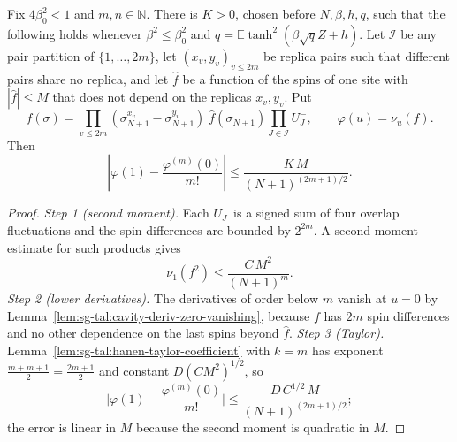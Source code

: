 \begin{lemma}\label{lem:sg-tal:hanen-rect-product-taylor}
\leanok
{}
Fix $4\beta_0^2<1$ and $m,n\in\mathbb N$. There is $K>0$, chosen before $N,\beta,h,q$, such that the following holds whenever
$\beta^2\le\beta_0^2$ and $q=\mathbb E\tanh^2(\beta\sqrt q Z+h)$. Let $\mathcal I$ be any pair partition of $\{1,\dots,2m\}$,
let $(x_v,y_v)_{v\le 2m}$ be replica pairs such that different pairs share no replica, and let $\hat f$ be a function of the spins of one site with $|\hat f|\le M$
that does not depend on the replicas $x_v,y_v$. Put
\[
 f(\sigma)=\prod_{v\le 2m}(\sigma^{x_v}_{N+1}-\sigma^{y_v}_{N+1})\;\hat f(\sigma_{N+1})\prod_{J\in\mathcal I}U_J^-,\qquad \varphi(u)=\nu_u(f).
\]
Then
\[
 \left|\varphi(1)-\frac{\varphi^{(m)}(0)}{m!}\right|\le\frac{K\,M}{(N+1)^{(2m+1)/2}}.
\]
\end{lemma}
\begin{proof}
\leanok
\emph{Step 1 (second moment).} Each $U_J^-$ is a signed sum of four overlap fluctuations and the spin differences are bounded by $2^{2m}$. A second-moment estimate for such products gives
\[
\nu_1(f^2)\le\frac{C\,M^2}{(N+1)^m}.
\]
\emph{Step 2 (lower derivatives).} The derivatives of order below $m$ vanish at $u=0$ by Lemma~\ref{lem:sg-tal:cavity-deriv-zero-vanishing}, because $f$ has $2m$ spin differences and no other dependence on the last spins beyond $\hat f$.
\emph{Step 3 (Taylor).} Lemma~\ref{lem:sg-tal:hanen-taylor-coefficient} with $k=m$ has exponent $\frac{m+m+1}2=\frac{2m+1}2$ and constant $D(CM^2)^{1/2}$, so
\[
\Big|\varphi(1)-\frac{\varphi^{(m)}(0)}{m!}\Big|\le\frac{D\,C^{1/2}\,M}{(N+1)^{(2m+1)/2}} ;
\]
the error is linear in $M$ because the second moment is quadratic in $M$.
\end{proof}


